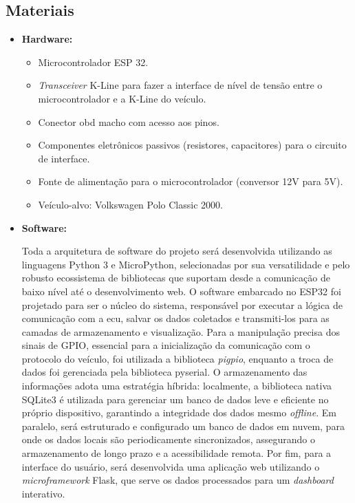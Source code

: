 \documentclass[a4paper, 12pt]{article}
\begin{document}
\subsection{Materiais}

\begin{itemize}

\item \textbf{Hardware:}

\begin{itemize}

\item Microcontrolador ESP 32.

\item \textit{Transceiver} K-Line para fazer a interface de nível de tensão entre o microcontrolador e a K-Line do veículo.

\item Conector \acrshort{obd} macho com acesso aos pinos.

\item Componentes eletrônicos passivos (resistores, capacitores) para o circuito de interface.

\item Fonte de alimentação para o microcontrolador (conversor 12V para 5V).

\item Veículo-alvo: Volkswagen Polo Classic 2000.

\end{itemize}

\item \textbf{Software:}

Toda a arquitetura de software do projeto será desenvolvida utilizando as linguagens Python 3 e MicroPython, selecionadas por sua versatilidade e pelo robusto ecossistema de bibliotecas que suportam desde a comunicação de baixo nível até o desenvolvimento web. O software embarcado no ESP32 foi projetado para ser o núcleo do sistema, responsável por executar a lógica de comunicação com a \acrshort{ecu}, salvar os dados coletados e transmiti-los para as camadas de armazenamento e visualização. Para a manipulação precisa dos sinais de GPIO, essencial para a inicialização da comunicação com o protocolo do veículo, foi utilizada a biblioteca \textit{pigpio}, enquanto a troca de dados foi gerenciada pela biblioteca pyserial. O armazenamento das informações adota uma estratégia híbrida: localmente, a biblioteca nativa SQLite3 é utilizada para gerenciar um banco de dados leve e eficiente no próprio dispositivo, garantindo a integridade dos dados mesmo \textit{offline}. Em paralelo, será estruturado e configurado um banco de dados em nuvem, para onde os dados locais são periodicamente sincronizados, assegurando o armazenamento de longo prazo e a acessibilidade remota. Por fim, para a interface do usuário, será desenvolvida uma aplicação web utilizando o \textit{microframework} Flask, que serve os dados processados para um \textit{dashboard} interativo.

\end{itemize}
\end{document}

